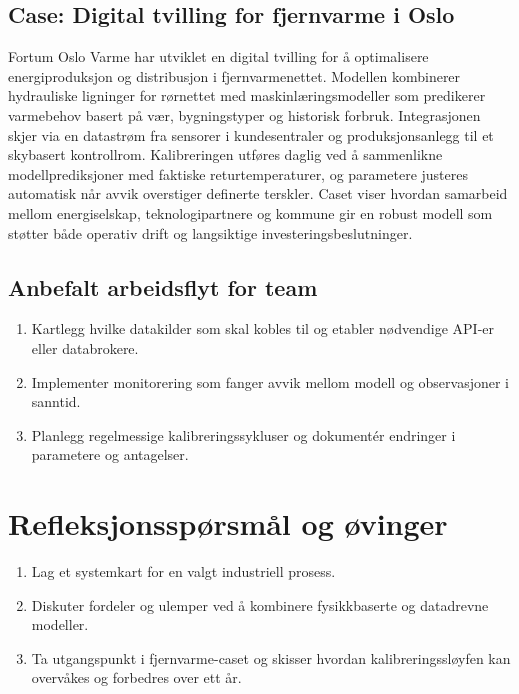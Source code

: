 \subsection{Case: Digital tvilling for fjernvarme i Oslo}
Fortum Oslo Varme har utviklet en digital tvilling for å optimalisere energiproduksjon og distribusjon i fjernvarmenettet.
Modellen kombinerer hydrauliske ligninger for rørnettet med maskinlæringsmodeller som predikerer varmebehov basert på vær,
bygningstyper og historisk forbruk. Integrasjonen skjer via en datastrøm fra sensorer i kundesentraler og produksjonsanlegg til
et skybasert kontrollrom. Kalibreringen utføres daglig ved å sammenlikne modellprediksjoner med faktiske returtemperaturer, og
parametere justeres automatisk når avvik overstiger definerte terskler. Caset viser hvordan samarbeid mellom energiselskap,
teknologipartnere og kommune gir en robust modell som støtter både operativ drift og langsiktige investeringsbeslutninger.

\subsection{Anbefalt arbeidsflyt for team}
\begin{enumerate}
    \item Kartlegg hvilke datakilder som skal kobles til og etabler nødvendige API-er eller databrokere.
    \item Implementer monitorering som fanger avvik mellom modell og observasjoner i sanntid.
    \item Planlegg regelmessige kalibreringssykluser og dokumentér endringer i parametere og antagelser.
\end{enumerate}


\section{Refleksjonsspørsmål og øvinger}
\begin{enumerate}
    \item Lag et systemkart for en valgt industriell prosess.
    \item Diskuter fordeler og ulemper ved å kombinere fysikkbaserte og datadrevne modeller.
    \item Ta utgangspunkt i fjernvarme-caset og skisser hvordan kalibreringssløyfen kan overvåkes og forbedres over ett år.
\end{enumerate}
